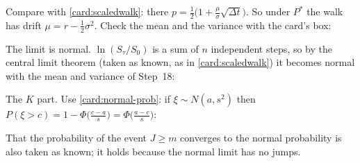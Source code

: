 \begin{steps}[resume]
\item Compare with \cref{card:scaledwalk}: there $p=\frac12\big(1+\frac\mu\sigma\sqrt{\Delta t}\big)$. So under $P^*$ the walk has drift $\mu=r-\frac12\sigma^2$. Check the mean and the variance with the card's box:
\begin{deriv}
\end{deriv}

\item The limit is normal. $\ln(S_\tau/S_0)$ is a sum of $n$ independent steps, so by the central limit theorem (taken as known, as in \cref{card:scaledwalk}) it becomes normal with the mean and variance of Step~18:
\begin{deriv}
\end{deriv}

\item The $K$ part. Use \cref{card:normal-prob}: if $\xi\sim N(a,s^2)$ then $P(\xi>c)=1-\Phi\big(\frac{c-a}{s}\big)=\Phi\big(\frac{a-c}{s}\big)$:
\begin{deriv}
\end{deriv}
That the probability of the event $J\ge m$ converges to the normal probability is also taken as known; it holds because the normal limit has no jumps.


\end{steps}
